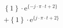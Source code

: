 \[
\begin{split}
&  \left \{ 1 \right \} \cdot \textrm{e}^{\{- j \cdot \pi \cdot t +2\}}\\
&+ \left \{ 1 \right \} \cdot \textrm{e}^{\{  j \cdot \pi \cdot t +2\}}
\end{split}
\]
